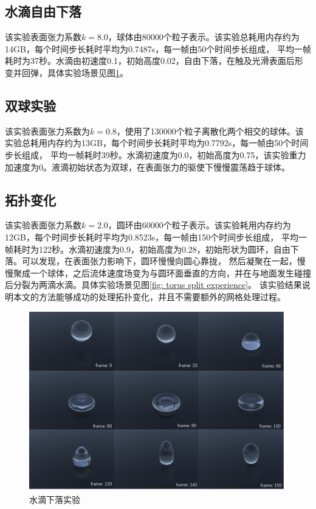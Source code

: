 \subsection{水滴自由下落}
该实验表面张力系数$k = 8.0$，球体由80000个粒子表示。该实验总耗用内存约为14GB，每个时间步长耗时平均为0.7487s，每一帧由50个时间步长组成，
平均一帧耗时为37秒。水滴由初速度0.1，初始高度0.02，自由下落，在触及光滑表面后形变并回弹，具体实验场景见图\ref{fig: sphere Drop experience}。


\subsection{双球实验}
该实验表面张力系数为$k = 0.8$，使用了130000个粒子离散化两个相交的球体。该实验总耗用内存约为13GB，每个时间步长耗时平均为0.7792s，每一帧由50个时间步长组成，
平均一帧耗时39秒。水滴初速度为0.0，初始高度为0.75，该实验重力加速度为0。液滴初始状态为双球，在表面张力的驱使下慢慢震荡趋于球体。

\subsection{拓扑变化}
该实验表面张力系数$k = 2.0$，圆环由60000个粒子表示。该实验耗用内存约为12GB，每个时间步长耗时平均为0.8523s，每一帧由150个时间步长组成，
平均一帧耗时为122秒。水滴初速度为0.9，初始高度为0.28，初始形状为圆环，自由下落。可以发现，在表面张力影响下，圆环慢慢向圆心靠拢，
然后凝聚在一起，慢慢聚成一个球体，之后流体速度场变为与圆环面垂直的方向，并在与地面发生碰撞后分裂为两滴水滴。具体实验场景见图\ref{fig: torus split experience}。
该实验结果说明本文的方法能够成功的处理拓扑变化，并且不需要额外的网格处理过程。


\begin{figure}[htbp]
    \centering
    \includegraphics[scale=0.6]{./images/DropNotSplashEXP.png}
    \caption[水滴下落实验]{水滴下落实验}
    \label{fig: sphere Drop experience}
\end{figure}

